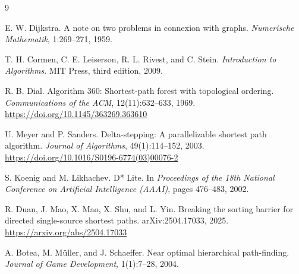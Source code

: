 \documentclass[11pt]{article}
\begin{document}
\begin{thebibliography}{9}

E. W. Dijkstra.
\newblock A note on two problems in connexion with graphs.
\newblock \emph{Numerische Mathematik}, 1:269--271, 1959.

T. H. Cormen, C. E. Leiserson, R. L. Rivest, and C. Stein.
\newblock \emph{Introduction to Algorithms}.
\newblock MIT Press, third edition, 2009.

R. B. Dial.
\newblock Algorithm 360: Shortest-path forest with topological ordering.
\newblock \emph{Communications of the ACM}, 12(11):632--633, 1969.
\newblock \url{https://doi.org/10.1145/363269.363610}

U. Meyer and P. Sanders.
\newblock Delta-stepping: A parallelizable shortest path algorithm.
\newblock \emph{Journal of Algorithms}, 49(1):114--152, 2003.
\newblock \url{https://doi.org/10.1016/S0196-6774(03)00076-2}

S. Koenig and M. Likhachev.
\newblock D* Lite.
\newblock In \emph{Proceedings of the 18th National Conference on Artificial Intelligence (AAAI)}, pages 476--483, 2002.

R. Duan, J. Mao, X. Mao, X. Shu, and L. Yin.
\newblock Breaking the sorting barrier for directed single-source shortest paths.
\newblock arXiv:2504.17033, 2025.
\newblock \url{https://arxiv.org/abs/2504.17033}

A. Botea, M. M\"uller, and J. Schaeffer.
\newblock Near optimal hierarchical path-finding.
\newblock \emph{Journal of Game Development}, 1(1):7--28, 2004.

\end{thebibliography}
\end{document}
